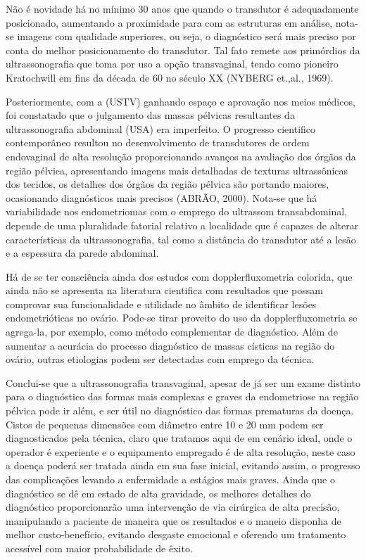 \documentclass[12pt]{article} %
\begin{document}
Não é novidade há no mínimo 30 anos que quando o transdutor é adequadamente posicionado, aumentando a proximidade para com as estruturas em análise, nota-se imagens com qualidade superiores, ou seja, o diagnóstico será mais preciso por conta do melhor posicionamento do transdutor. Tal fato remete aos primórdios da ultrassonografia que toma por uso a opção transvaginal, tendo como pioneiro Kratochwill em fins da década de 60 no século XX (NYBERG et.,al., 1969). 

Posteriormente, com a (USTV) ganhando espaço e aprovação nos meios médicos, foi constatado que o julgamento das massas pélvicas resultantes da ultrassonografia abdominal (USA) era imperfeito. O progresso cientifico contemporâneo resultou no desenvolvimento de transdutores de ordem endovaginal de alta resolução proporcionando avanços na avaliação dos órgãos da região pélvica, apresentando imagens mais detalhadas de texturas ultrassônicas dos tecidos, os detalhes dos órgãos da região pélvica são portando maiores, ocasionando diagnósticos mais precisos (ABRÃO, 2000). Nota-se que há variabilidade nos endometriomas com o emprego do ultrassom transabdominal, depende de uma pluralidade fatorial relativo a localidade que é capazes de alterar características da ultrassonografia, tal como a distância do transdutor até a lesão e a espessura da parede abdominal. 

Há de se ter consciência ainda dos estudos com dopplerfluxometria colorida, que ainda não se apresenta na literatura cientifica com resultados que possam comprovar sua
funcionalidade e utilidade no âmbito de identificar lesões endometrióticas no ovário. Pode-se tirar proveito do uso da dopplerfluxometria se agrega-la, por exemplo, como método complementar de diagnóstico. Além de aumentar a acurácia do processo diagnóstico de massas císticas na região do ovário, outras etiologias podem ser detectadas com emprego da técnica. 

Conclui-se que a ultrassonografia transvaginal, apesar de já ser um exame distinto para o diagnóstico das formas mais complexas e graves da endometriose na região pélvica pode ir além, e ser útil no diagnóstico das formas prematuras da doença. Cistos de pequenas dimensões com diâmetro entre 10 e 20 mm podem ser diagnosticados pela técnica, claro que tratamos aqui de em cenário ideal, onde o operador é experiente e o equipamento empregado é de alta resolução, neste caso a doença poderá ser tratada ainda em sua fase inicial, evitando assim, o progresso das complicações levando a enfermidade a estágios mais graves.  Ainda que o diagnóstico se dê em estado de alta gravidade, os melhores detalhes do diagnóstico proporcionarão uma intervenção de via cirúrgica de alta precisão, manipulando a paciente de maneira que os resultados e o maneio disponha de melhor custo-benefício, evitando desgaste emocional e oferendo um tratamento acessível com maior probabilidade de êxito.     
\end{document}
